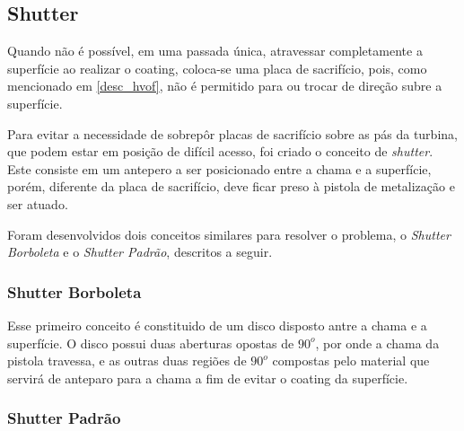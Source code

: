 \subsection{Shutter}
Quando não é possível, em uma passada única, atravessar completamente a
superfície ao realizar o coating, coloca-se uma placa de sacrifício, pois, como mencionado em
\ref{desc_hvof}, não é permitido para ou trocar de direção subre a superfície.

Para evitar a necessidade de sobrepôr placas de sacrifício sobre as pás da
turbina, que podem estar em posição de difícil acesso, foi criado o conceito de
\textit{shutter}. Este consiste em um antepero a ser posicionado entre a chama e
a superfície, porém, diferente da placa de sacrifício, deve ficar preso à
pistola de metalização e ser atuado.



Foram desenvolvidos dois conceitos similares para resolver o problema, o \textit{Shutter
Borboleta} e o \textit{Shutter Padrão}, descritos a seguir.

\subsubsection{Shutter Borboleta}

Esse primeiro conceito é constituido de um disco disposto antre a chama e a
superfície. O disco possui duas aberturas opostas de $90^o$, por onde a chama da
pistola travessa, e as outras duas regiões de $90^o$ compostas pelo material que
servirá de anteparo para a chama a fim de evitar o coating da superfície. 

\subsubsection{Shutter Padrão}